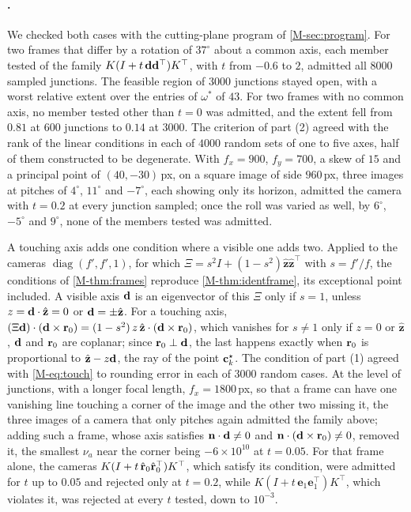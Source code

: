 \paragraph{.} We checked both cases with the cutting-plane program of \cref{M-sec:program}. For two frames that differ by a rotation of $37^\circ$ about a common axis, each member tested of the family $K(I+t\,\mathbf{d}\mathbf{d}^{\top})K^{\top}$, with $t$ from $-0.6$ to $2$, admitted all $8000$ sampled junctions. The feasible region of $3000$ junctions stayed open, with a worst relative extent over the entries of $\omega^{*}$ of $43$. For two frames with no common axis, no member tested other than $t=0$ was admitted, and the extent fell from $0.81$ at $600$ junctions to $0.14$ at $3000$. The criterion of part (2) agreed with the rank of the linear conditions in each of $4000$ random sets of one to five axes, half of them constructed to be degenerate. With $f_x=900$, $f_y=700$, a skew of $15$ and a principal point of $(40,-30)$\,px, on a square image of side $960$\,px, three images at pitches of $4^\circ$, $11^\circ$ and $-7^\circ$, each showing only its horizon, admitted the camera with $t=0.2$ at every junction sampled; once the roll was varied as well, by $6^\circ$, $-5^\circ$ and $9^\circ$, none of the members tested was admitted.

A touching axis adds one condition where a visible one adds two. Applied to the cameras $\operatorname{diag}(f',f',1)$, for which $\Xi=s^2I+(1-s^2)\hat{\mathbf z}\hat{\mathbf z}^{\top}$ with $s=f'/f$, the conditions of \cref{M-thm:frames} reproduce \cref{M-thm:identframe}, its exceptional point included. A visible axis $\mathbf{d}$ is an eigenvector of this $\Xi$ only if $s=1$, unless $z=\mathbf{d}\cdot\hat{\mathbf z}=0$ or $\mathbf{d}=\pm\hat{\mathbf z}$. For a touching axis, $(\Xi\mathbf{d})\cdot(\mathbf{d}\times\mathbf{r}_0)=(1-s^2)\,z\,\hat{\mathbf z}\cdot(\mathbf{d}\times\mathbf{r}_0)$, which vanishes for $s\neq1$ only if $z=0$ or $\hat{\mathbf z}$, $\mathbf{d}$ and $\mathbf{r}_0$ are coplanar; since $\mathbf{r}_0\perp\mathbf{d}$, the last happens exactly when $\mathbf{r}_0$ is proportional to $\hat{\mathbf z}-z\mathbf{d}$, the ray of the point $\mathbf{c}^{\star}_k$. The condition of part (1) agreed with \eqref{M-eq:touch} to rounding error in each of $3000$ random cases. At the level of junctions, with a longer focal length, $f_x=1800$\,px, so that a frame can have one vanishing line touching a corner of the image and the other two missing it, the three images of a camera that only pitches again admitted the family above; adding such a frame, whose axis satisfies $\mathbf n\cdot\mathbf{d}\neq0$ and $\mathbf n\cdot(\mathbf{d}\times\mathbf{r}_0)\neq0$, removed it, the smallest $\nu_a$ near the corner being $-6\times10^{10}$ at $t=0.05$. For that frame alone, the cameras $K(I+t\,\hat{\mathbf{r}}_0\hat{\mathbf{r}}_0^{\top})K^{\top}$, which satisfy its condition, were admitted for $t$ up to $0.05$ and rejected only at $t=0.2$, while $K(I+t\,\mathbf e_1\mathbf e_1^{\top})K^{\top}$, which violates it, was rejected at every $t$ tested, down to $10^{-3}$.

